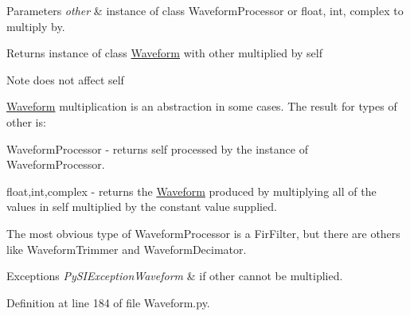 \begin{DoxyParams}{Parameters}
{\em other} & instance of class Waveform\+Processor or float, int, complex to multiply by. \\
\hline
\end{DoxyParams}
\begin{DoxyReturn}{Returns}
instance of class \hyperlink{classSignalIntegrity_1_1TimeDomain_1_1Waveform_1_1Waveform_1_1Waveform}{Waveform} with other multiplied by self 
\end{DoxyReturn}
\begin{DoxyNote}{Note}
does not affect self 

\hyperlink{classSignalIntegrity_1_1TimeDomain_1_1Waveform_1_1Waveform_1_1Waveform}{Waveform} multiplication is an abstraction in some cases. The result for types of other is\+:
\begin{DoxyItemize}
\item Waveform\+Processor -\/ returns self processed by the instance of Waveform\+Processor.
\item float,int,complex -\/ returns the \hyperlink{classSignalIntegrity_1_1TimeDomain_1_1Waveform_1_1Waveform_1_1Waveform}{Waveform} produced by multiplying all of the values in self multiplied by the constant value supplied. 
\end{DoxyItemize}

The most obvious type of Waveform\+Processor is a Fir\+Filter, but there are others like Waveform\+Trimmer and Waveform\+Decimator. 
\end{DoxyNote}

\begin{DoxyExceptions}{Exceptions}
{\em Py\+S\+I\+Exception\+Waveform} & if other cannot be multiplied. \\
\hline
\end{DoxyExceptions}


Definition at line 184 of file Waveform.\+py.

\mbox{\label{classSignalIntegrity_1_1TimeDomain_1_1Waveform_1_1Waveform_1_1Waveform_aa0b54a20b36fcc55e1147de88d083072}} 
